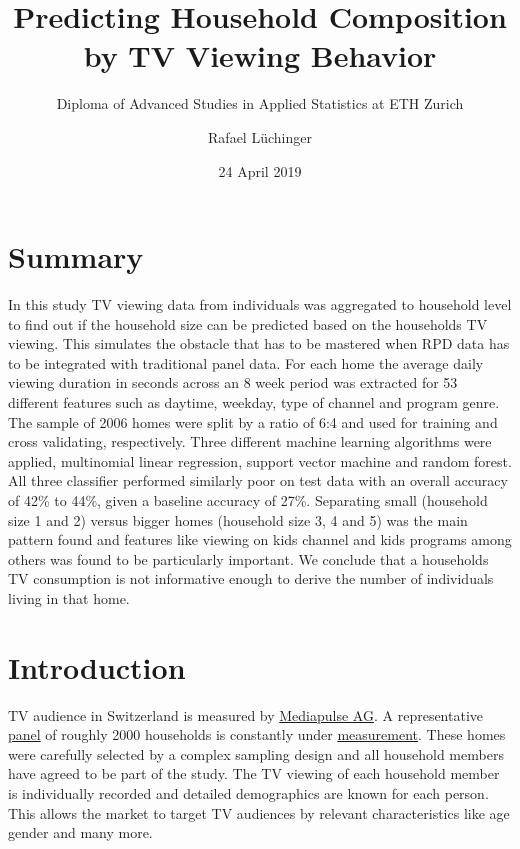 \documentclass[]{article}
\title{Predicting Household Composition by TV Viewing Behavior}
\subtitle{Diploma of Advanced Studies in Applied Statistics at ETH Zurich}
\author{Rafael Lüchinger}
\date{24 April 2019}
\begin{document}
\maketitle

{
\setcounter{tocdepth}{2}
\tableofcontents
}
\hypertarget{summary}{%
\section{Summary}\label{summary}}

In this study TV viewing data from individuals was aggregated to
household level to find out if the household size can be predicted based
on the households TV viewing. This simulates the obstacle that has to be
mastered when RPD data has to be integrated with traditional panel data.
For each home the average daily viewing duration in seconds across an 8
week period was extracted for 53 different features such as daytime,
weekday, type of channel and program genre. The sample of 2006 homes
were split by a ratio of 6:4 and used for training and cross validating,
respectively. Three different machine learning algorithms were applied,
multinomial linear regression, support vector machine and random forest.
All three classifier performed similarly poor on test data with an
overall accuracy of 42\% to 44\%, given a baseline accuracy of 27\%.
Separating small (household size 1 and 2) versus bigger homes (household
size 3, 4 and 5) was the main pattern found and features like viewing on
kids channel and kids programs among others was found to be particularly
important. We conclude that a households TV consumption is not
informative enough to derive the number of individuals living in that
home.

\hypertarget{introduction}{%
\section{Introduction}\label{introduction}}

TV audience in Switzerland is measured by
\href{https:://www.mediapulse.ch/en}{Mediapulse AG}. A representative
\href{https:://www.mediapulse.ch/en/tv/research-method/the-panel.html}{panel}
of roughly 2000 households is constantly under
\href{https:://www.mediapulse.ch/en/tv/research-method/the-measuring-technique.html}{measurement}.
These homes were carefully selected by a complex sampling design and all
household members have agreed to be part of the study. The TV viewing of
each household member is individually recorded and detailed demographics
are known for each person. This allows the market to target TV audiences
by relevant characteristics like age gender and many more.
\end{document}
